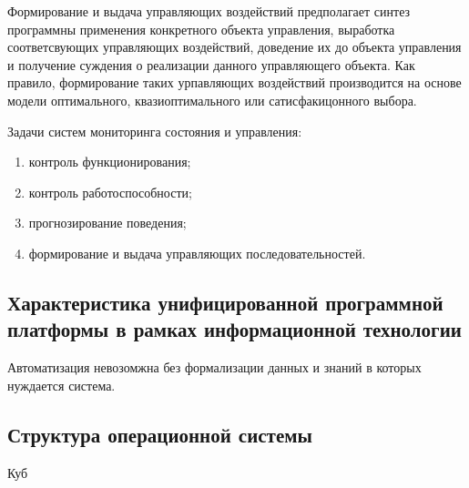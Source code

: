 \documentclass[a4paper,12pt]{report}
\begin{document}
	Формирование и выдача управляющих воздействий предполагает синтез программны
	применения конкретного объекта управления, выработка соответсвующих
	управляющих воздействий, доведение их до объекта управления и получение
	суждения о реализации данного управляющего объекта. Как правило, формирование
	таких урпавляющих воздействий производится на основе модели оптимального,
	квазиоптимального или сатисфакицонного выбора.

	Задачи систем мониторинга состояния и управления:
	\begin{enumerate}
		\item контроль функционирования;
		\item контроль работоспособности;
		\item прогнозирование поведения;
		\item формирование и выдача управляющих последовательностей.
	\end{enumerate}


\subsection{Характеристика унифицированной программной платформы в рамках
	информационной технологии}

	Автоматизация невозомжна без формализации данных и знаний в которых
	нуждается система.


\subsection{Структура операционной системы}

	Куб
\end{document}
